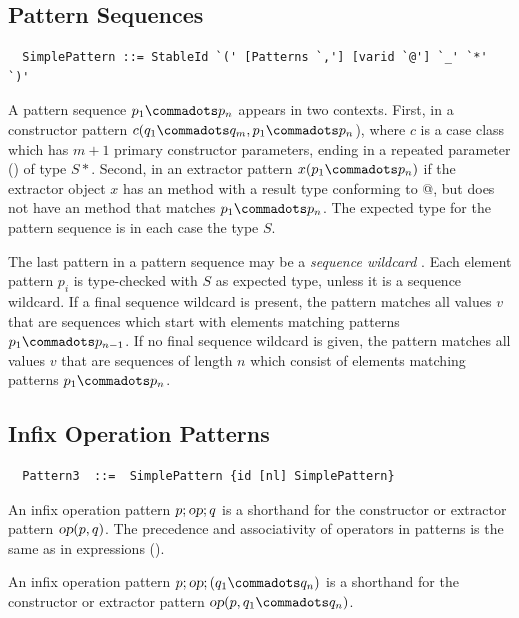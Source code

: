 \subsection{Pattern Sequences}\label{sec:pattern-seqs}

\syntax\begin{lstlisting}
  SimplePattern ::= StableId `(' [Patterns `,'] [varid `@'] `_' `*' `)'
\end{lstlisting}

A pattern sequence $p_1 \commadots p_n$ appears in two
contexts. First, in a constructor pattern
$c(q_1 \commadots q_m, p_1 \commadots p_n$), where $c$ is a case
class which has $m+1$ primary constructor parameters, 
ending in a repeated parameter () of type 
$S*$. Second, in an extractor pattern
$x(p_1 \commadots p_n)$ if the extractor object $x$ has an
 method with a result type conforming to 
\lstinline@Seq[$S$]@, but does not have an  method that 
matches $p_1 \commadots p_n$.
The expected type for the pattern sequence is in each case the type $S$.

The last pattern in a pattern sequence may be a {\em sequence
wildcard} \code{_*}. Each element pattern $p_i$ is type-checked with
$S$ as expected type, unless it is a sequence wildcard. If a final
sequence wildcard is present, the pattern matches all values $v$ that
are sequences which start with elements matching patterns
$p_1 \commadots p_{n-1}$.  If no final sequence wildcard is given, the
pattern matches all values $v$ that are sequences of
length $n$ which consist of elements matching patterns $p_1 \commadots
p_n$.

\subsection{Infix Operation Patterns}

\syntax\begin{lstlisting}
  Pattern3  ::=  SimplePattern {id [nl] SimplePattern}
\end{lstlisting}

An infix operation pattern $p;\mbox{\sl op};q$ is a shorthand for the
constructor or extractor pattern $\mbox{\sl op}(p, q)$.  The precedence and
associativity of operators in patterns is the same as in expressions
().

An infix operation pattern $p;\op;(q_1 \commadots q_n)$ is a
shorthand for the constructor or extractor pattern $\op(p, q_1
\commadots q_n)$.

